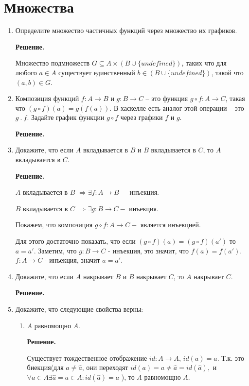 \section*{Множества}
\begin{enumerate}

\item Определите множество частичных функций через множество их графиков.

\textbf{Решение.} 

Множество подмножеств $G \subseteq A \times (B \cup \{undefined\})$,
таких что для любого $a \in A$ существует единственный
$b \in (B \cup \{undefined\})$, такой что $(a, b) \in G$.

\item Композиция функций $f : A \to B$ и $g : B \to C$ -- это функция $g \circ f : A \to C$, 
такая что $(g \circ f)(a) = g(f(a))$.
    В хаскелле есть аналог этой операции -- это $g\ .\ f$.
    Задайте график функции $g \circ f$ через графики $f$ и $g$.

\textbf{Решение.} 


\item Докажите, что если $A$ вкладывается в $B$ и $B$ вкладывается в $C$, то $A$ вкладывается в $C$.

\textbf{Решение.} 

$A$ вкладывается в $B$ $\Rightarrow \exists f:A\rightarrow B - $ инъекция.

$B$ вкладывается в $C$ $\Rightarrow \exists g:B\rightarrow C - $ инъекция.

Покажем, что композиция $g \circ f : A\rightarrow C - $ является инъекцией.

Для этого достаточно показать, что если $(g \circ f)(a) = (g \circ f)(a')$ 
то $a = a'$. Заметим, что $g:B\rightarrow C$ - инъекция, это значит, что 
$f(a) = f(a')$. $f:A\rightarrow C$ - инъекция, значит $a = a'$.

\item Докажите, что если $A$ накрывает $B$ и $B$ накрывает $C$, то $A$ накрывает $C$.

\textbf{Решение.} 

\item Докажите, что следующие свойства верны:
\begin{enumerate}
\item $A$ равномощно $A$.

\textbf{Решение.} 

Существует тождественное отображение $id: A\rightarrow A$, $id(a) = a$. Т.к. это биекция(для 
$a\neq \hat{a}$, они переходят $id(a) = a \neq \hat{a} = id(\hat{a}),$ и $\forall a\in A 
\exists\hat{a} = a \in A : id(\hat{a}) = a$ ), то $A$ равномощно $A$. 


\end{enumerate}
\end{enumerate}
